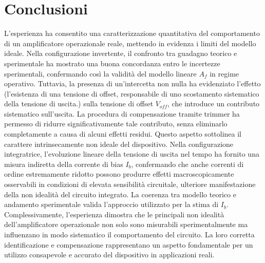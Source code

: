 \documentclass[a4paper, oneside]{article}
\begin{document}
\section{Conclusioni}
L'esperienza ha consentito una caratterizzazione quantitativa del comportamento di un
amplificatore operazionale reale, mettendo in evidenza i limiti del modello ideale.
Nella configurazione invertente, il confronto tra guadagno teorico e sperimentale ha
mostrato una buona concordanza entro le incertezze sperimentali, confermando così la
validità del modello lineare $A_f$ in regime operativo. Tuttavia, la presenza
di un'intercetta non nulla ha evidenziato l'effetto (l'esistenza di una tensione di
offset, responsabile di uno scostamento sistematico della tensione di uscita.) sulla
tensione di offset $V_{off}$, che introduce un contributo sistematico sull'uscita.
La procedura di compensazione tramite trimmer ha permesso di ridurre
significativamente tale contributo, senza eliminarlo completamente
a causa di alcuni effetti residui. Questo aspetto sottolinea il
carattere intrinsecamente non ideale del dispositivo. 
Nella configurazione integratrice, l'evoluzione lineare della
tensione di uscita nel tempo ha fornito una misura indiretta
della corrente di bias $I_b$, confermando che anche correnti di
ordine estremamente ridotto possono produrre effetti macroscopicamente
osservabili in condizioni di elevata sensibilità circuitale, ulteriore
manifestazione della non idealità del circuito integrato. La coerenza
tra modello teorico e andamento sperimentale valida l'approccio utilizzato
per la stima di $I_b$.
Complessivamente, l'esperienza dimostra che le principali non idealità dell'amplificatore
operazionale non solo sono misurabili sperimentalmente ma influenzano in modo sistematico
il comportamento del circuito. La loro corretta identificazione e compensazione
rappresentano un aspetto fondamentale per un utilizzo consapevole e accurato
del dispositivo in applicazioni reali.
\end{document}
